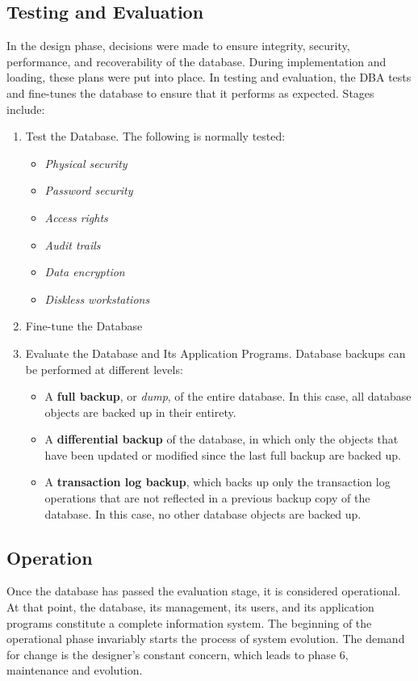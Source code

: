 \documentclass[a4paper, 12pt, titlepage]{report}
\begin{document}
\subsection{Testing and	Evaluation}
In the design phase, decisions were made to ensure integrity, security, performance, and recoverability of the database. During implementation and loading, these plans were put into place. In testing and evaluation, the DBA tests and fine-tunes the database to ensure that it performs as expected. Stages include:
\begin{enumerate}
\item Test the Database.
The following is normally tested:
\begin{itemize}
\item \emph{Physical security}
\item \emph{Password security }
\item \emph{Access rights}
\item \emph{Audit trails }
\item \emph{Data encryption}
\item \emph{Diskless workstations}
\end{itemize}
\item Fine-tune the Database
\item Evaluate the Database and Its Application Programs.
Database backups can be performed at different levels:
\begin{itemize}
\item A \textbf{full backup}, or \emph{dump}, of the entire database. In this case, all database objects are backed up in their entirety.
\item A \textbf{differential backup} of the database, in which only the objects that have been updated or modified since the last full backup are backed up.
\item A \textbf{transaction log backup}, which backs up only the transaction log operations that are not reflected in a previous backup copy of the database. In this case, no other database objects are backed up. 
\end{itemize}
\end{enumerate}
\subsection{Operation}
Once the database has passed the evaluation stage, it is considered operational. At that point, the database, its management, its users, and its application programs constitute a
complete information system. The beginning of the operational phase invariably starts the process of system evolution. The demand for change is the designer’s constant concern, which leads to phase 6, maintenance and evolution.
\end{document}
